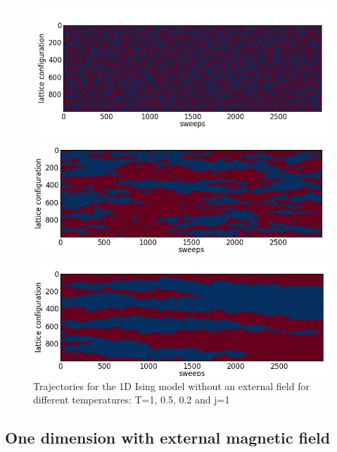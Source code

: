 \documentclass[12pt,a4paper,titlepage]{article}
\begin{document}
\begin{figure}
\centering

\begin{minipage}[b]{\linewidth}
	\centering
	\includegraphics[width=13.6cm]{Plots/Trajectory_1D_1}
\end{minipage}
\begin{minipage}[b]{\linewidth}
	\centering
	\includegraphics[width=13.5cm]{Plots/Trajectory_1D_05}
\end{minipage}
\begin{minipage}[b]{\linewidth}
	\centering
	\includegraphics[width=13.45cm]{Plots/Trajectory_1D_02}
\end{minipage}
\caption{Trajectories for the 1D Ising model without an external field for different temperatures: T=1, 0.5, 0.2 and j=1}
\label{fig:traj1d}
\end{figure}

\newpage
\subsection{One dimension with external magnetic field}
\end{document}

